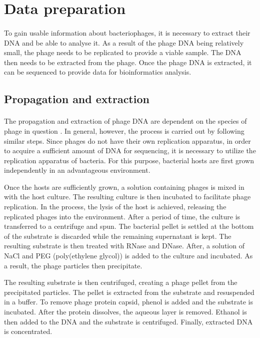 \section{Data preparation}
\paragraph*{}
To gain usable information about bacteriophages, it is necessary to extract their DNA and be able to analyse it. As a result of the phage DNA being relatively small, the phage needs to be replicated to provide a viable sample. The DNA then needs to be extracted from the phage. Once the phage DNA is extracted, it can be sequenced to provide data for bioinformatics analysis. 

\subsection{Propagation and extraction}
\paragraph*{}
The propagation and extraction of phage DNA are dependent on the species of phage in question \cite{kleiner2015evaluation}. In general, however, the process is carried out by following similar steps. Since phages do not have their own replication apparatus, in order to acquire a sufficient amount of DNA for sequencing, it is necessary to utilize the replication apparatus of bacteria. For this purpose, bacterial hosts are first grown independently in an advantageous environment.

Once the hosts are sufficiently grown, a solution containing phages is mixed in with the host culture. The resulting culture is then incubated to facilitate phage replication. In the process, the lysis of the host is achieved, releasing the replicated phages into the environment. After a period of time, the culture is transferred to a centrifuge and spun. The bacterial pellet is settled at the bottom of the substrate is discarded while the remaining supernatant is kept. The resulting substrate is then treated with RNase and DNase. After, a solution of NaCl and PEG (poly(ethylene glycol)) is added to the culture and incubated. As a result, the phage particles then precipitate. 

The resulting substrate is then centrifuged, creating a phage pellet from the precipitated particles. The pellet is extracted from the substrate and resuspended in a buffer. To remove phage protein capsid, phenol is added and the substrate is incubated. After the protein dissolves, the aqueous layer is removed. Ethanol is then added to the DNA and the substrate is centrifuged. Finally, extracted DNA is concentrated.

